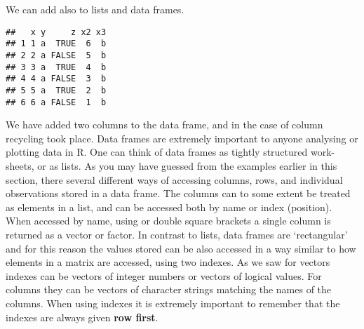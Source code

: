 \documentclass[paper=a4,10pt,div=17,headsepline,BCOR=12mm,twoside,open=right]{scrbook}\usepackage{knitr}
\begin{document}
We can add also to lists and data frames.

\begin{knitrout}\footnotesize
{}\color{fgcolor}\begin{kframe}
\begin{alltt}
\hlopt{$} \hlkwb{<-} \hlopt{:}
\hlopt{$} \hlkwb{<-} 
\end{alltt}
\begin{verbatim}
##   x y     z x2 x3
## 1 1 a  TRUE  6  b
## 2 2 a FALSE  5  b
## 3 3 a  TRUE  4  b
## 4 4 a FALSE  3  b
## 5 5 a  TRUE  2  b
## 6 6 a FALSE  1  b
\end{verbatim}
\end{kframe}
\end{knitrout}

We have added two columns to the data frame, and in the case of column  recycling took place. Data frames are extremely important to anyone analysing or plotting data in R. One can think of data frames as tightly structured work-sheets, or as lists. As you may have guessed from the examples earlier in this section, there several different ways of accessing columns, rows, and individual observations stored in a data frame. The columns can to some extent be treated as elements in a list, and can be accessed both by name or index (position). When accessed by name, using \code{\$} or double square brackets a single column is returned as a vector or factor. In contrast to lists, data frames are `rectangular' and for this reason the values stored can be also accessed in a way similar to how elements in a matrix are accessed, using two indexes. As we saw for vectors indexes can be vectors of integer numbers or vectors of logical values. For columns they can be vectors of character strings matching the names of the columns. When using indexes it is extremely important to remember that the indexes are always given \textbf{row first}.
\end{document}
